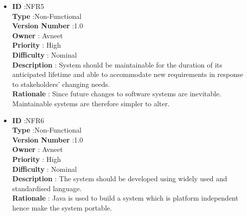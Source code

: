 \documentclass[a4paper,12pt]{report}
\begin{document}
\begin{itemize}
	\item
    \textbf{ID } \hspace{3cm} :NFR5  \\
	\textbf{Type } \hspace{2.4cm}  :Non-Functional\\
	\textbf{Version Number} \hspace{0.3cm} :1.0  \\
	\textbf{Owner } \hspace{1.98cm} : Avneet \\
	\textbf{Priority } \hspace{1.75cm} : High\\
	\textbf{Difficulty } \hspace{1.5cm} : Nominal\\
	\textbf{Description }\hspace{1.2cm} : System should be maintainable for the duration of its anticipated lifetime and able to accommodate new requirements in response to stakeholders' changing needs. \\
	\textbf{Rationale }\hspace{1.6cm} : Since future changes to software systems are inevitable. Maintainable systems are therefore simpler to alter.\\

	\item
    \textbf{ID } \hspace{3cm} :NFR6  \\
	\textbf{Type } \hspace{2.4cm}  :Non-Functional\\
	\textbf{Version Number} \hspace{0.3cm} :1.0  \\
	\textbf{Owner } \hspace{1.98cm} : Avneet \\
	\textbf{Priority } \hspace{1.75cm} : High\\
	\textbf{Difficulty } \hspace{1.5cm} : Nominal\\
	\textbf{Description }\hspace{1.2cm} : The system should be developed using widely used and standardised language. \\
	\textbf{Rationale }\hspace{1.6cm} : Java is used to build a system which is platform independent hence make the system portable.\\


\end{itemize}
\end{document}
